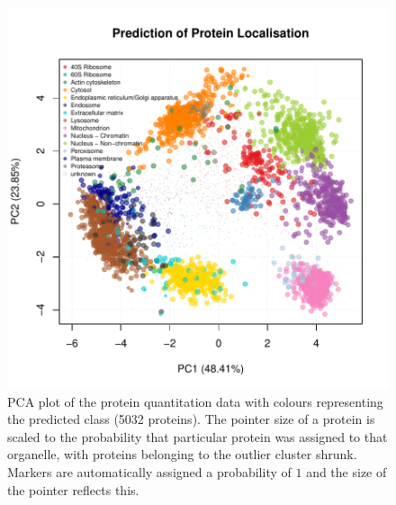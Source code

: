 \documentclass[12pt,english]{article}
\begin{document}
\begin{figure}[ht]
\includegraphics{tagm-008}

  \centering
  \caption{PCA plot of the protein quantitation data with colours representing
    the predicted class (5032 proteins). The pointer size of a protein is scaled to
    the probability that particular protein was assigned to that organelle, with proteins belonging
    to the outlier cluster shrunk. Markers
are automatically assigned a probability of $1$ and the size of the pointer reflects this.}
  \label{fig:assignmentPCAMCMC}
\end{figure}
\end{document}
